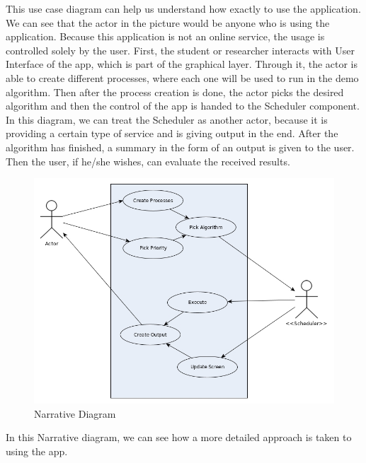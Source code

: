 \documentclass{article}
\begin{document}
This use case diagram can help us understand how exactly to use the application. We can see that the actor in the picture would be anyone who is using the application. Because this application is not an online service, the usage is controlled solely by the user. First, the student or researcher interacts with User Interface of the app, which is part of the graphical layer. Through it, the actor is able to create different processes, where each one will be used to run in the demo algorithm. Then after the process creation is done, the actor picks the desired algorithm and then the control of the app is handed to the Scheduler component. In this diagram, we can treat the Scheduler as another actor, because it is providing a certain type of service and is giving output in the end. After the algorithm has finished, a summary in the form of an output is given to the user. Then the user, if he/she wishes, can evaluate the received results.

\begin{figure}[H]
  \includegraphics[width=\linewidth]{./pics/narrative.jpg}
  \caption{Narrative Diagram}
  \label{fig:Narrative Diagram}
\end{figure}

In this Narrative diagram, we can see how a more detailed approach is taken to using the app.
\end{document}
